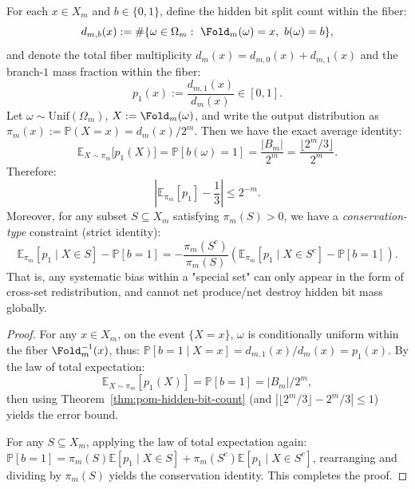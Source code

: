 \begin{corollary}\label{cor:pom-branch-mass-law}
For each $x\in X_m$ and $b\in\{0,1\}$, define the hidden bit split count within the fiber:
\[
d_{m,b}(x):=\#\{\omega\in\Omega_m:\ \Fold_m(\omega)=x,\ b(\omega)=b\},
\]
and denote the total fiber multiplicity $d_m(x)=d_{m,0}(x)+d_{m,1}(x)$ and the branch-$1$ mass fraction within the fiber:
\[
p_1(x):=\frac{d_{m,1}(x)}{d_m(x)}\in[0,1].
\]
Let $\omega\sim\mathrm{Unif}(\Omega_m)$, $X:=\Fold_m(\omega)$, and write the output distribution as $\pi_m(x):=\mathbb{P}(X=x)=d_m(x)/2^m$.
Then we have the exact average identity:
\[
\boxed{\;
\mathbb{E}_{X\sim\pi_m}\bigl[p_1(X)\bigr]
=\mathbb{P}[b(\omega)=1]
=\frac{|B_m|}{2^m}
=\frac{\lfloor 2^m/3\rfloor}{2^m}. \;}
\]
Therefore:
\[
\left|\mathbb{E}_{\pi_m}[p_1]-\frac13\right|\le 2^{-m}.
\]
Moreover, for any subset $S\subseteq X_m$ satisfying $\pi_m(S)>0$, we have a \emph{conservation-type} constraint (strict identity):
\[
\boxed{\;
\mathbb{E}_{\pi_m}[p_1\mid X\in S]-\mathbb{P}[b=1]
=-\frac{\pi_m(S^c)}{\pi_m(S)}
\left(\mathbb{E}_{\pi_m}[p_1\mid X\in S^c]-\mathbb{P}[b=1]\right). \;}
\]
That is, any systematic bias within a "special set" can only appear in the form of cross-set redistribution, and cannot net produce/net destroy hidden bit mass globally.
\end{corollary}
\begin{proof}
For any $x\in X_m$, on the event $\{X=x\}$, $\omega$ is conditionally uniform within the fiber $\Fold_m^{-1}(x)$, thus:
\(
\mathbb{P}[b=1\mid X=x]=d_{m,1}(x)/d_m(x)=p_1(x)
\).
By the law of total expectation:
\[
\mathbb{E}_{X\sim\pi_m}[p_1(X)]=\mathbb{P}[b=1]=|B_m|/2^m,
\]
then using Theorem~\ref{thm:pom-hidden-bit-count} (and $|\lfloor 2^m/3\rfloor-2^m/3|\le 1$) yields the error bound.
\par
For any $S\subseteq X_m$, applying the law of total expectation again:
\(
\mathbb{P}[b=1]=\pi_m(S)\mathbb{E}[p_1\mid X\in S]+\pi_m(S^c)\mathbb{E}[p_1\mid X\in S^c]
\),
rearranging and dividing by $\pi_m(S)$ yields the conservation identity. This completes the proof.
\end{proof}

